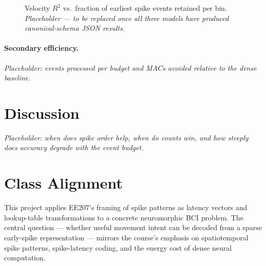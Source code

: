 \documentclass[11pt]{article}
\begin{document}
\begin{figure}[h]
  \centering
  \caption{Velocity $R^2$ vs.\ fraction of earliest spike events
  retained per bin. \emph{Placeholder --- to be replaced once all three
  models have produced canonical-schema JSON results.}}
  \label{fig:frontier}
\end{figure}

\paragraph{Secondary efficiency.}
\emph{Placeholder: events processed per budget and MACs avoided
relative to the dense baseline.}

\section{Discussion}
\emph{Placeholder: when does spike order help, when do counts win,
and how steeply does accuracy degrade with the event budget.}

\section{Class Alignment}
This project applies EE207's framing of spike patterns as latency
vectors and lookup-table transformations to a concrete neuromorphic BCI
problem. The central question --- whether useful movement intent can
be decoded from a sparse early-spike representation --- mirrors the
course's emphasis on spatiotemporal spike patterns, spike-latency
coding, and the energy cost of dense neural computation.



\end{document}
